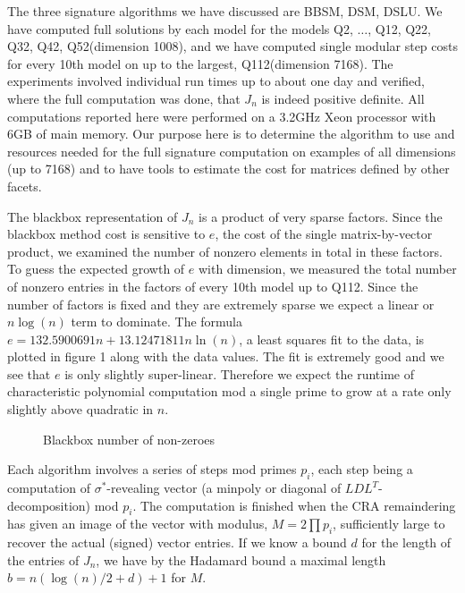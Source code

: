 \documentclass{acm_proc_article-sp}
\newcommand{\signature}{\ensuremath{\sigma^{*}}}
\begin{document}
The three signature algorithms we have discussed are BBSM, DSM, DSLU.
We have computed full solutions by each model for the models
Q2, $\ldots$, Q12, Q22, Q32, Q42, Q52(dimension 1008),
and we have computed single modular step costs for every 10th model on up to the largest,
Q112(dimension 7168).
The experiments involved individual run times up to about one day and 
verified, where the full computation was done, that $J_n$ is indeed positive definite.
All computations reported here were performed on a 3.2GHz Xeon processor with 6GB of main memory.
Our purpose here is to determine the algorithm to use and resources needed for the full 
signature computation on examples of all dimensions (up to 7168) and to have tools to 
estimate the cost for matrices defined by other facets.

The blackbox representation of $J_n$ is a product of very sparse factors. 
Since the blackbox method cost is sensitive to $e$, the cost of the single matrix-by-vector product, 
we examined the number of nonzero elements in total in these factors.
To guess the expected growth of $e$ with dimension, we measured the total number
of nonzero entries in the factors of every 10th model up to Q112.
Since the number of factors is fixed and they are extremely sparse we expect a linear or 
$n\log(n)$ term to dominate.  The formula 
$e = 132.5900691 n + 13.12471811 n \ln(n)$, a least squares fit to the data, is 
plotted in figure 1 along with the data values. 
The fit is extremely
good and we see that $e$ is only slightly super-linear.  Therefore we expect
the runtime of characteristic polynomial computation mod a single prime to grow at 
a rate only slightly above quadratic in $n$.
\begin{figure}[h] %
\caption{Blackbox number of non-zeroes}
\end{figure}

Each algorithm involves a series of steps mod primes $p_i$, each step being
a computation of \signature-revealing vector (a minpoly or diagonal of $LDL^T$-decomposition) 
mod $p_i$.
The computation is finished when the CRA remaindering has given an image of the vector
with modulus, \(M = 2 \prod p_i\), sufficiently large to recover the actual (signed) 
vector entries.  If we know a bound $d$ for the length of the entries of $J_n$,
we have by the Hadamard bound a maximal length $b = n(\log(n)/2 + d) + 1$ for $M$.
\end{document}
